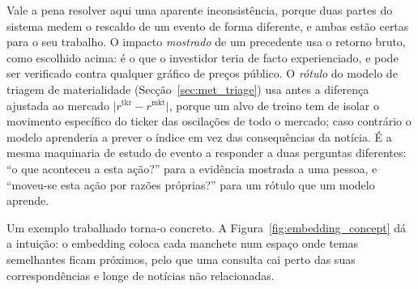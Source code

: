 Vale a pena resolver aqui uma aparente inconsistência, porque duas partes do sistema medem o rescaldo de um
evento de forma diferente, e ambas estão certas para o seu trabalho. O impacto \emph{mostrado} de um
precedente usa o retorno bruto, como escolhido acima: é o que o investidor teria de facto experienciado, e
pode ser verificado contra qualquer gráfico de preços público. O \emph{rótulo} do modelo de triagem de
materialidade (Secção~\ref{sec:met_triage}) usa antes a diferença ajustada ao mercado
$\lvert r^{\mathrm{tkr}} - r^{\mathrm{mkt}} \rvert$, porque um alvo de treino tem de isolar o movimento
específico do ticker das oscilações de todo o mercado; caso contrário o modelo aprenderia a prever o índice
em vez das consequências da notícia. É a mesma maquinaria de estudo de evento a responder a duas perguntas
diferentes: ``o que aconteceu a esta ação?'' para a evidência mostrada a uma pessoa, e ``moveu-se esta ação
por razões próprias?'' para um rótulo que um modelo aprende.

Um exemplo trabalhado torna-o concreto. A Figura~\ref{fig:embedding_concept} dá a intuição: o embedding
coloca cada manchete num espaço onde temas semelhantes ficam próximos, pelo que uma consulta cai perto das
suas correspondências e longe de notícias não relacionadas.

